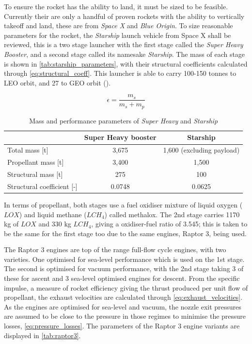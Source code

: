 
To ensure the rocket has the ability to land, it must be sized to be feasible. Currently their are only a handful of proven rockets with the ability to vertically takeoff and land, these are from \textit{Space X} and \textit{Blue Origin}. To size reasonable parameters for the rocket, the \textit{Starship} launch vehicle from Space X shall be reviewed, this is a two stage launcher with the first stage called the \textit{Super Heavy Booster}, and a second stage called its namesake \textit{Starship}. The mass of each stage is shown in \autoref{tab:starship_parameters}, with their structural coefficients calculated through \autoref{eq:structural_coeff}. This launcher is able to carry 100-150 tonnes to LEO orbit, and 27 to GEO orbit (\cite{SpaceX2020_StarshipGuide}).

\begin{equation}
    \epsilon = \frac{m_s}{m_s + m_p}
\label{eq:structural_coeff}
\end{equation}

\begin{table}[htbp]
    \centering
    \caption{Mass and performance parameters of \textit{Super Heavy} and \textit{Starship}}
    \label{tab:starship_parameters}
    \begin{tabular}{@{}lcc@{}}
        \toprule
        & \textbf{Super Heavy booster} & \textbf{Starship} \\ \midrule
        Total mass [t]                          & 3,675 & 1,600 (excluding payload) \\
        Propellant mass [t]                     & 3,400 & 1,500 \\
        Structural mass [t]  & 275    & 100 \\
        Structural coefficient [-] & 0.0748 & 0.0625 \\ \bottomrule
    \end{tabular}
\end{table}

In terms of propellant, both stages use a fuel oxidiser mixture of liquid oxygen ($LOX$) and liquid methane ($LCH_4$) called methalox. The 2nd stage carries 1170 kg of $LOX$ and 330 kg $LCH_4$, giving a oxidiser-fuel ratio of 3.545; this is taken to be the same for the first stage too due to the same engines, Raptor 3, being used.


The Raptor 3 engines are top of the range full-flow cycle engines, with two varieties. One optimised for sea-level performance which is used on the 1st stage. The second is optimised for vacuum performance, with the 2nd stage taking 3 of these for ascent and 3 sea-level optimised engines for descent. From the specific impulse, a measure of rocket efficiency giving the thrust produced per unit flow of propellant, the exhaust velocities are calculated through \autoref{eq:exhaust_velocities}. As the engines are optimised for sea-level and vacuum, the nozzle exit pressures are assumed to be close to the pressure in those regimes to minimise the pressure losses, \autoref{eq:pressure_losses}. The parameters of the Raptor 3 engine variants are displayed in \autoref{tab:raptor3}.

